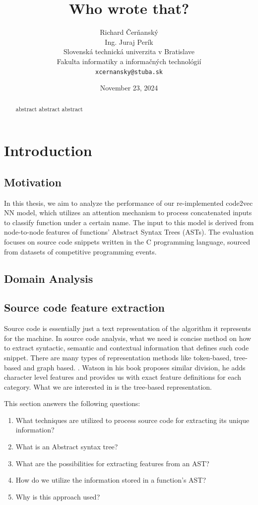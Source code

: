 \documentclass[10pt,english,a4paper]{report}
\title{Who wrote that?}
\author{Richard Čerňanský\\ Ing. Juraj Perík\\
	{\small Slovenská technická univerzita v Bratislave}\\
	{\small Fakulta informatiky a informačných technológií}\\
	{\small \texttt{xcernansky@stuba.sk}}\\
	}
\date{\small November 23, 2024}
\begin{document}
\maketitle

\begin{abstract}
abstract abstract abstract

\end{abstract}

\chapter{Introduction}

\section{Motivation}

In this thesis, we aim to analyze the performance of our re-implemented code2vec NN model, which utilizes an attention mechanism to process concatenated inputs to classify function under a certain name. The input to this model is derived from node-to-node features of functions' Abstract Syntax Trees (ASTs). The evaluation focuses on source code snippets written in the C programming language, sourced from datasets of competitive programming events.

\section{Domain Analysis}

\section{Source code feature extraction}
Source code is essentially just a text representation of the algorithm it 
represents for the machine. In source code analysis, what we need is 
concise method on how to extract syntactic, semantic and contextual information that defines such code snippet. There are many types of representation methods like token-based, tree-based and graph based.
\cite{samoaa}. Watson in his book \cite{DanielWatson} proposes similar division, he adds character level features and provides us with exact feature definitions for each category.  What we are interested in is the tree-based representation.

This section answers the following questions:

\begin{enumerate}
    \item What techniques are utilized to process source code for extracting its unique information?
    \item What is an Abstract syntax tree?
    \item What are the possibilities for extracting features from an AST?
    \item How do we utilize the information stored in a function's AST?
    \item Why is this approach used?
\end{enumerate}
\end{document}

